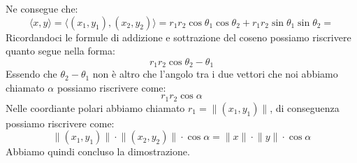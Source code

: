 Ne consegue che:
\begin{equation*}
	\langle x, y \rangle = \langle (x_1, y_1), (x_2, y_2) \rangle = r_1r_2
    \cos{\theta_1}\cos{\theta_2} + r_1r_2\sin{\theta_1}\sin{\theta_2} =
\end{equation*}
Ricordandoci le formule di addizione e sottrazione del coseno possiamo 
riscrivere quanto segue nella forma:
\begin{equation*}
	r_1r_2\cos{\theta_2 - \theta_1} 
\end{equation*}
Essendo che $\theta_2 - \theta_1$ non è altro che l'angolo tra i due vettori 
che noi abbiamo chiamato $\alpha$ possiamo riscrivere come:
\begin{equation*}
	r_1r_2 \cos{\alpha} 
\end{equation*}
Nelle coordiante polari abbiamo chiamato $ r_1 = \lVert (x_1, y_1) \rVert$, di 
conseguenza possiamo riscrivere come:
\begin{equation*}
	\lVert (x_1, y_1) \rVert \cdot \lVert (x_2, y_2) \rVert \cdot \cos{\alpha} 
    = \lVert x \rVert \cdot \lVert y \rVert \cdot \cos{\alpha}
\end{equation*}
Abbiamo quindi concluso la dimostrazione.


